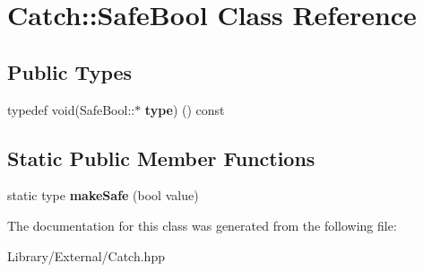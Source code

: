 \hypertarget{class_catch_1_1_safe_bool}{}\section{Catch\+:\+:Safe\+Bool Class Reference}
\label{class_catch_1_1_safe_bool}
\subsection*{Public Types}
\begin{DoxyCompactItemize}
\item 
\hypertarget{class_catch_1_1_safe_bool_a852cdacb020a98edeee0f4da4cf790d5}{}typedef void(Safe\+Bool\+::$\ast$ {\bfseries type}) () const \label{class_catch_1_1_safe_bool_a852cdacb020a98edeee0f4da4cf790d5}

\end{DoxyCompactItemize}
\subsection*{Static Public Member Functions}
\begin{DoxyCompactItemize}
\item 
\hypertarget{class_catch_1_1_safe_bool_af0ea63d9820f8bf7a8b76377913c4e77}{}static type {\bfseries make\+Safe} (bool value)\label{class_catch_1_1_safe_bool_af0ea63d9820f8bf7a8b76377913c4e77}

\end{DoxyCompactItemize}


The documentation for this class was generated from the following file\+:\begin{DoxyCompactItemize}
\item 
Library/\+External/Catch.\+hpp\end{DoxyCompactItemize}
